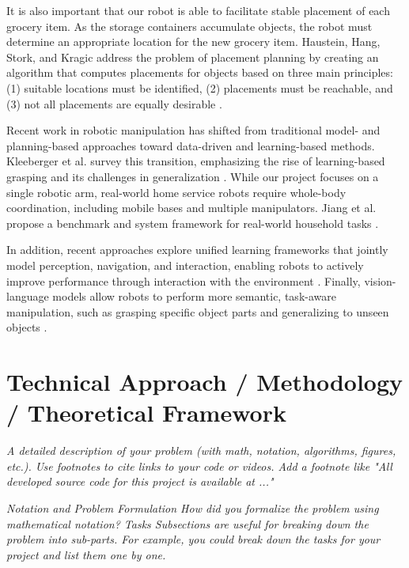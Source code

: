 \documentclass{article}
\begin{document}
It is also important that our robot is able to facilitate stable placement of each grocery item. As the storage containers accumulate objects, the robot must determine an appropriate location for the new grocery item. Haustein, Hang, Stork, and Kragic address the problem of placement planning by creating an algorithm that computes placements for objects based on three main principles: (1) suitable locations must be identified, (2) placements must be reachable, and (3) not all placements are equally desirable \cite{8967732}.

Recent work in robotic manipulation has shifted from traditional model- and planning-based approaches toward data-driven and learning-based methods. Kleeberger et al. survey this transition, emphasizing the rise of learning-based grasping and its challenges in generalization \cite{kleeberger2020survey}. While our project focuses on a single robotic arm, real-world home service robots require whole-body coordination, including mobile bases and multiple manipulators. Jiang et al. propose a benchmark and system framework for real-world household tasks \cite{jiang2025behavior}.

In addition, recent approaches explore unified learning frameworks that jointly model perception, navigation, and interaction, enabling robots to actively improve performance through interaction with the environment \cite{uppal2024spin}. Finally, vision-language models allow robots to perform more semantic, task-aware manipulation, such as grasping specific object parts and generalizing to unseen objects \cite{oort2025open}.


\section{Technical Approach / Methodology / Theoretical Framework}



\textit{A detailed description of your problem (with math, notation, algorithms, figures, etc.). Use footnotes to cite links to your code or videos. Add a footnote like "All developed source code for this project is available at ..."}

\textit{Notation and Problem Formulation
How did you formalize the problem using mathematical notation?
Tasks
Subsections are useful for breaking down the problem into sub-parts. For example, you could break down the tasks for your project and list them one by one. 
}
\end{document}

